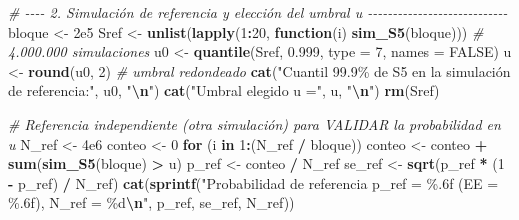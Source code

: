 \documentclass[
  spanish,
]{article}
\newenvironment{Shaded}{\begin{snugshade}}{\end{snugshade}}
\newcommand{\AttributeTok}[1]{\textcolor[rgb]{0.13,0.29,0.53}{#1}}
\newcommand{\CommentTok}[1]{\textcolor[rgb]{0.56,0.35,0.01}{\textit{#1}}}
\newcommand{\ConstantTok}[1]{\textcolor[rgb]{0.56,0.35,0.01}{#1}}
\newcommand{\ControlFlowTok}[1]{\textcolor[rgb]{0.13,0.29,0.53}{\textbf{#1}}}
\newcommand{\DecValTok}[1]{\textcolor[rgb]{0.00,0.00,0.81}{#1}}
\newcommand{\FloatTok}[1]{\textcolor[rgb]{0.00,0.00,0.81}{#1}}
\newcommand{\FunctionTok}[1]{\textcolor[rgb]{0.13,0.29,0.53}{\textbf{#1}}}
\newcommand{\NormalTok}[1]{#1}
\newcommand{\OtherTok}[1]{\textcolor[rgb]{0.56,0.35,0.01}{#1}}
\newcommand{\SpecialCharTok}[1]{\textcolor[rgb]{0.81,0.36,0.00}{\textbf{#1}}}
\newcommand{\StringTok}[1]{\textcolor[rgb]{0.31,0.60,0.02}{#1}}
\begin{document}
\begin{Shaded}
\begin{Highlighting}[]
\CommentTok{\# {-}{-}{-}{-} 2. Simulación de referencia y elección del umbral u {-}{-}{-}{-}{-}{-}{-}{-}{-}{-}{-}{-}{-}{-}{-}{-}{-}{-}{-}{-}{-}{-}{-}{-}{-}{-}{-}{-}}
\NormalTok{bloque }\OtherTok{\textless{}{-}} \FloatTok{2e5}
\NormalTok{Sref }\OtherTok{\textless{}{-}} \FunctionTok{unlist}\NormalTok{(}\FunctionTok{lapply}\NormalTok{(}\DecValTok{1}\SpecialCharTok{:}\DecValTok{20}\NormalTok{, }\ControlFlowTok{function}\NormalTok{(i) }\FunctionTok{sim\_S5}\NormalTok{(bloque)))     }\CommentTok{\# 4.000.000 simulaciones}
\NormalTok{u0 }\OtherTok{\textless{}{-}} \FunctionTok{quantile}\NormalTok{(Sref, }\FloatTok{0.999}\NormalTok{, }\AttributeTok{type =} \DecValTok{7}\NormalTok{, }\AttributeTok{names =} \ConstantTok{FALSE}\NormalTok{)}
\NormalTok{u  }\OtherTok{\textless{}{-}} \FunctionTok{round}\NormalTok{(u0, }\DecValTok{2}\NormalTok{)                                           }\CommentTok{\# umbral redondeado}
\FunctionTok{cat}\NormalTok{(}\StringTok{"Cuantil 99.9\% de S5 en la simulación de referencia:"}\NormalTok{, u0, }\StringTok{"}\SpecialCharTok{\textbackslash{}n}\StringTok{"}\NormalTok{)}
\FunctionTok{cat}\NormalTok{(}\StringTok{"Umbral elegido u ="}\NormalTok{, u, }\StringTok{"}\SpecialCharTok{\textbackslash{}n}\StringTok{"}\NormalTok{)}
\FunctionTok{rm}\NormalTok{(Sref)}

\CommentTok{\# Referencia independiente (otra simulación) para VALIDAR la probabilidad en u}
\NormalTok{N\_ref }\OtherTok{\textless{}{-}} \FloatTok{4e6}
\NormalTok{conteo }\OtherTok{\textless{}{-}} \DecValTok{0}
\ControlFlowTok{for}\NormalTok{ (i }\ControlFlowTok{in} \DecValTok{1}\SpecialCharTok{:}\NormalTok{(N\_ref }\SpecialCharTok{/}\NormalTok{ bloque)) conteo }\OtherTok{\textless{}{-}}\NormalTok{ conteo }\SpecialCharTok{+} \FunctionTok{sum}\NormalTok{(}\FunctionTok{sim\_S5}\NormalTok{(bloque) }\SpecialCharTok{\textgreater{}}\NormalTok{ u)}
\NormalTok{p\_ref  }\OtherTok{\textless{}{-}}\NormalTok{ conteo }\SpecialCharTok{/}\NormalTok{ N\_ref}
\NormalTok{se\_ref }\OtherTok{\textless{}{-}} \FunctionTok{sqrt}\NormalTok{(p\_ref }\SpecialCharTok{*}\NormalTok{ (}\DecValTok{1} \SpecialCharTok{{-}}\NormalTok{ p\_ref) }\SpecialCharTok{/}\NormalTok{ N\_ref)}
\FunctionTok{cat}\NormalTok{(}\FunctionTok{sprintf}\NormalTok{(}\StringTok{"Probabilidad de referencia p\_ref = \%.6f (EE = \%.6f), N\_ref = \%d}\SpecialCharTok{\textbackslash{}n}\StringTok{"}\NormalTok{,}
\NormalTok{            p\_ref, se\_ref, N\_ref))}


\end{Highlighting}
\end{Shaded}
\end{document}
